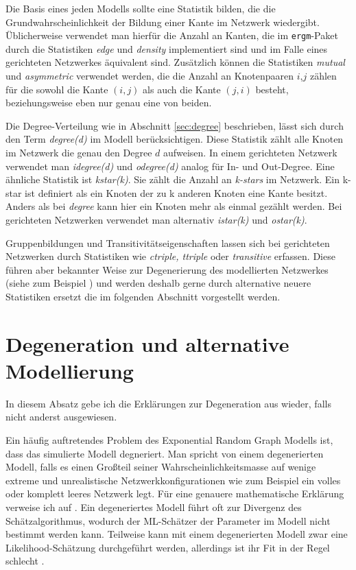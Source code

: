 \documentclass[a4paper,ngerman,oneside,titlepage,bibliography=totoc,11pt]{scrreprt}
\begin{document}
Die Basis eines jeden Modells sollte eine Statistik bilden, die die Grundwahrscheinlichkeit der Bildung einer Kante im Netzwerk wiedergibt. Üblicherweise verwendet man hierfür die Anzahl an Kanten, die im \texttt{ergm}-Paket durch die Statistiken \textit{edge} und \textit{density} implementiert sind und im Falle eines gerichteten Netzwerkes äquivalent sind. Zusätzlich können die Statistiken \textit{mutual} und \textit{asymmetric} verwendet werden, die die Anzahl an Knotenpaaren $i$,$j$ zählen für die sowohl die Kante $(i,j)$ als auch die Kante $(j,i)$ besteht, beziehungsweise eben nur genau eine von beiden.

Die Degree-Verteilung wie in Abschnitt \ref{sec:degree} beschrieben, lässt sich durch den Term \textit{degree(d)} im Modell berücksichtigen. Diese Statistik zählt alle Knoten im Netzwerk die genau den Degree $d$ aufweisen. In einem gerichteten Netzwerk verwendet man \textit{idegree(d)} und \textit{odegree(d)} analog für In- und Out-Degree. Eine ähnliche Statistik ist \textit{kstar(k)}. Sie zählt die Anzahl an \emph{k-stars} im Netzwerk. Ein k-star ist definiert als ein Knoten der zu k anderen Knoten eine Kante besitzt. Anders als bei \textit{degree} kann hier ein Knoten mehr als einmal gezählt werden. Bei gerichteten Netzwerken verwendet man alternativ \textit{istar(k)} und \textit{ostar(k)}.

Gruppenbildungen und Transitivitätseigenschaften lassen sich bei gerichteten Netzwerken durch Statistiken wie \textit{ctriple, ttriple} oder \textit{transitive} erfassen. Diese führen aber bekannter Weise zur Degenerierung des modellierten Netzwerkes (siehe zum Beispiel \citep{morris2008specification, hunter2008ergm, handcock2008statnet}) und werden deshalb gerne durch alternative neuere Statistiken ersetzt die im folgenden Abschnitt vorgestellt werden.

\section{Degeneration und alternative Modellierung}
\label{sec:degeneration}
In diesem Absatz gebe ich die Erklärungen zur Degeneration aus \citep{handcock2008statnet}wieder, falls nicht anderst ausgewiesen.

Ein häufig auftretendes Problem des Exponential Random Graph Modells ist, dass das simulierte Modell degneriert. Man spricht von einem degenerierten Modell, falls es einen Großteil seiner Wahrscheinlichkeitsmasse auf wenige extreme und unrealistische Netzwerkkonfigurationen wie zum Beispiel ein volles oder komplett leeres Netzwerk legt. Für eine genauere mathematische Erklärung verweise ich auf \citep{handcock2003assessing}. Ein degeneriertes Modell führt oft zur Divergenz des Schätzalgorithmus, wodurch der ML-Schätzer der Parameter im Modell nicht bestimmt werden kann. Teilweise kann mit einem degenerierten Modell zwar eine Likelihood-Schätzung durchgeführt werden, allerdings ist ihr Fit in der Regel schlecht .
\end{document}

